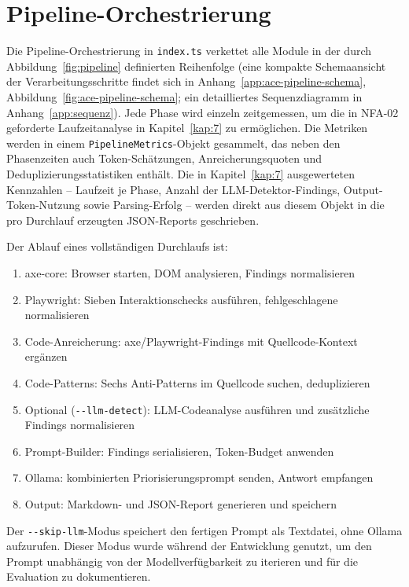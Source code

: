 \section{Pipeline-Orchestrierung}
\label{sec:impl-pipeline}

Die Pipeline-Orchestrierung in \texttt{index.ts} verkettet alle Module in der durch Abbildung~\ref{fig:pipeline} definierten Reihenfolge (eine kompakte Schemaansicht der Verarbeitungsschritte findet sich in Anhang~\ref{app:ace-pipeline-schema}, Abbildung~\ref{fig:ace-pipeline-schema}; ein detailliertes Sequenzdiagramm in Anhang~\ref{app:sequenz}). Jede Phase wird einzeln zeitgemessen, um die in \ac{NFA}-02 geforderte Laufzeitanalyse in Kapitel~\ref{kap:7} zu ermöglichen. Die Metriken werden in einem \texttt{PipelineMetrics}-Objekt gesammelt, das neben den Phasenzeiten auch Token-Schätzungen, Anreicherungsquoten und Deduplizierungsstatistiken enthält. Die in Kapitel~\ref{kap:7} ausgewerteten Kennzahlen -- Laufzeit je Phase, Anzahl der LLM-Detektor-Findings, Output-Token-Nutzung sowie Parsing-Erfolg -- werden direkt aus diesem Objekt in die pro Durchlauf erzeugten \acs{JSON}-Reports geschrieben.

Der Ablauf eines vollständigen Durchlaufs ist:

\begin{enumerate}
  \item axe-core: Browser starten, \ac{DOM} analysieren, Findings normalisieren
  \item Playwright: Sieben Interaktionschecks ausführen, fehlgeschlagene normalisieren
  \item Code-Anreicherung: axe/Playwright-Findings mit Quellcode-Kontext ergänzen
  \item Code-Patterns: Sechs Anti-Patterns im Quellcode suchen, deduplizieren
  \item Optional (\texttt{-{}-llm-detect}): LLM-Codeanalyse ausführen und zusätzliche Findings normalisieren
  \item Prompt-Builder: Findings serialisieren, Token-Budget anwenden
  \item Ollama: kombinierten Priorisierungsprompt senden, Antwort empfangen
  \item Output: Markdown- und JSON-Report generieren und speichern
\end{enumerate}

Der \texttt{-{}-skip-llm}-Modus speichert den fertigen Prompt als Textdatei, ohne Ollama aufzurufen. Dieser Modus wurde während der Entwicklung genutzt, um den Prompt unabhängig von der Modellverfügbarkeit zu iterieren und für die Evaluation zu dokumentieren.

